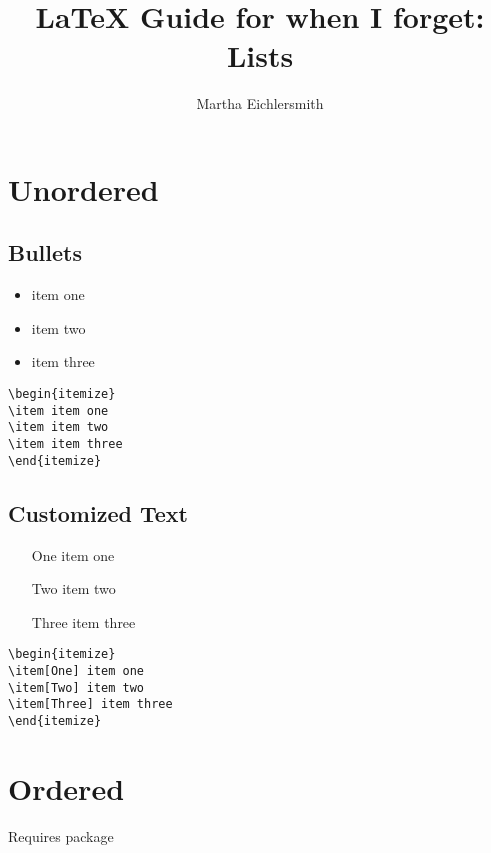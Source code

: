 \documentclass[12pt, letterpaper]{article}
\begin{document}
\title{LaTeX Guide for when I forget: Lists} 
\author{Martha Eichlersmith}
\maketitle 
\newpage 

\section{Unordered}
\subsection{Bullets} 
\begin{itemize}
	\item item one 
	\item item two
	\item item three
\end{itemize}
\begin{lstlisting}
\begin{itemize}
\item item one
\item item two
\item item three
\end{itemize}
\end{lstlisting}

\subsection{Customized Text}
\begin{itemize}
	\item[One] item one 
	\item[Two] item two
	\item[Three] item three
\end{itemize}
\begin{lstlisting}
\begin{itemize}
\item[One] item one 
\item[Two] item two
\item[Three] item three
\end{itemize}
\end{lstlisting}


\section{Ordered}
Requires  package
\end{document}
